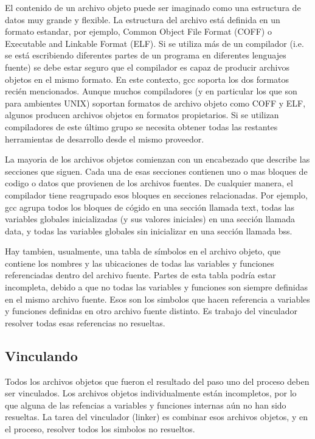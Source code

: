 \documentclass[12pt]{article}
\begin{document}
El contenido de un archivo objeto puede ser imaginado como una estructura de datos
muy grande y flexible. La estructura del archivo está definida en un formato estandar, 
por ejemplo, Common Object File Format (COFF) o Executable and Linkable Format (ELF).
Si se utiliza más de un compilador (i.e. se está escribiendo diferentes partes de un programa
en diferentes lenguajes fuente) se debe estar seguro que el compilador es capaz
de producir archivos objetos en el mismo formato. En este contexto, gcc soporta 
los dos formatos recién mencionados. Aunque muchos compiladores (y en particular
los que son para ambientes UNIX) soportan formatos de archivo objeto como
COFF y ELF, algunos producen archivos objetos en formatos propietarios.
Si se utilizan compiladores de este último grupo se necesita obtener todas
las restantes herramientas de desarrollo desde el mismo proveedor.


La mayoria de los archivos objetos comienzan con un encabezado que describe las secciones
que siguen. Cada una de esas secciones contienen uno o mas bloques de codigo o datos que 
provienen de los archivos fuentes. De cualquier manera, el compilador tiene reagrupado
esos bloques en secciones relacionadas. Por ejemplo, gcc agrupa todos los bloques de
cógido en una sección llamada text, todas las variables globales inicializadas (y sus
valores iniciales) en una sección llamada data, y todas las variables globales sin 
inicializar en una sección llamada bss.

Hay tambien, usualmente, una tabla de símbolos en el archivo objeto, que contiene
los nombres y las ubicaciones de todas las variables y funciones referenciadas dentro
del archivo fuente. Partes de esta tabla podría estar incompleta, debido a que
no todas las variables y funciones son siempre definidas en el mismo archivo fuente. 
Esos son los simbolos que hacen referencia a variables y funciones definidas en 
otro archivo fuente distinto. Es trabajo del vinculador resolver todas esas referencias
no resueltas.

\subsection *{Vinculando}

Todos los archivos objetos que fueron el resultado del paso uno del proceso deben
ser vinculados. Los archivos objetos individualmente están incompletos, por lo que
alguna de las refencias a variables y funciones internas aún no han sido resueltas.
La tarea del vinculador (linker) es combinar esos archivos objetos, y en el proceso,
resolver todos los simbolos no resueltos.
\end{document}
